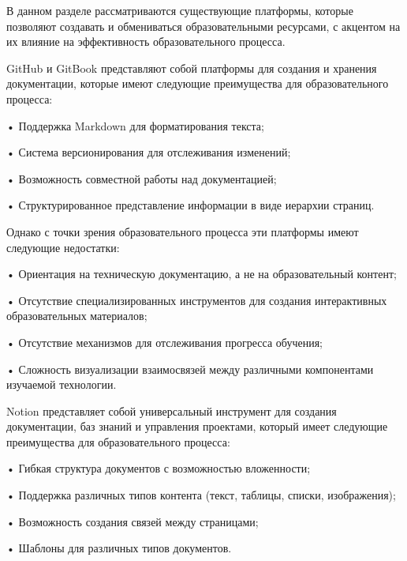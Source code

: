 \subtitlespace

{\gostFont

  \par \redline В данном разделе рассматриваются существующие платформы, которые позволяют создавать и обмениваться образовательными ресурсами, с акцентом на их влияние на эффективность образовательного процесса.

  \par \redline GitHub и GitBook представляют собой платформы для создания и хранения документации, которые имеют следующие преимущества для образовательного процесса:
  
  \par \redline • Поддержка Markdown для форматирования текста;
  \par \redline • Система версионирования для отслеживания изменений;
  \par \redline • Возможность совместной работы над документацией;
  \par \redline • Структурированное представление информации в виде иерархии страниц.
  
  \par \redline Однако с точки зрения образовательного процесса эти платформы имеют следующие недостатки:
  
  \par \redline • Ориентация на техническую документацию, а не на образовательный контент;
  \par \redline • Отсутствие специализированных инструментов для создания интерактивных образовательных материалов;
  \par \redline • Отсутствие механизмов для отслеживания прогресса обучения;
  \par \redline • Сложность визуализации взаимосвязей между различными компонентами изучаемой технологии.

  \par \redline Notion представляет собой универсальный инструмент для создания документации, баз знаний и управления проектами, который имеет следующие преимущества для образовательного процесса:
  
  \par \redline • Гибкая структура документов с возможностью вложенности;
  \par \redline • Поддержка различных типов контента (текст, таблицы, списки, изображения);
  \par \redline • Возможность создания связей между страницами;
  \par \redline • Шаблоны для различных типов документов.
  
}
